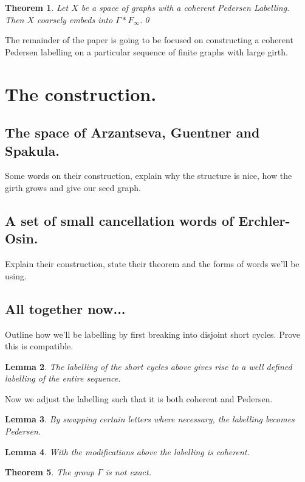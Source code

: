 \documentclass[11pt,a4paper]{amsart}
\theoremstyle{plain}
\newtheorem{theorem}{Theorem}%
\newtheorem{lemma}[theorem]{Lemma}%
\theoremstyle{definition}%
\theoremstyle{remark}%
\begin{document}
\begin{theorem}
Let $X$ be a space of graphs with a coherent Pedersen Labelling. Then $X$ coarsely embeds into $\Gamma \ast F_{\infty}$.\qed
\end{theorem}

The remainder of the paper is going to be focused on constructing a coherent Pedersen labelling on a particular sequence of finite graphs with large girth.

\section{The construction.}

\subsection{The space of Arzantseva, Guentner and Spakula.}

Some words on their construction, explain why the structure is nice, how the girth grows and give our seed graph.

\subsection{A set of small cancellation words of Erchler-Osin.}

Explain their construction, state their theorem and the forms of words we'll be using.

\subsection{All together now...}

Outline how we'll be labelling by first breaking into disjoint short cycles. Prove this is compatible.

\begin{lemma}
The labelling of the short cycles above gives rise to a well defined labelling of the entire sequence.
\end{lemma}

Now we adjust the labelling such that it is both coherent and Pedersen.

\begin{lemma}
By swapping certain letters where necessary, the labelling becomes Pedersen.
\end{lemma}

\begin{lemma}
With the modifications above the labelling is coherent.
\end{lemma}

\begin{theorem}
The group $\Gamma$ is not exact.
\end{theorem}




\end{document}
